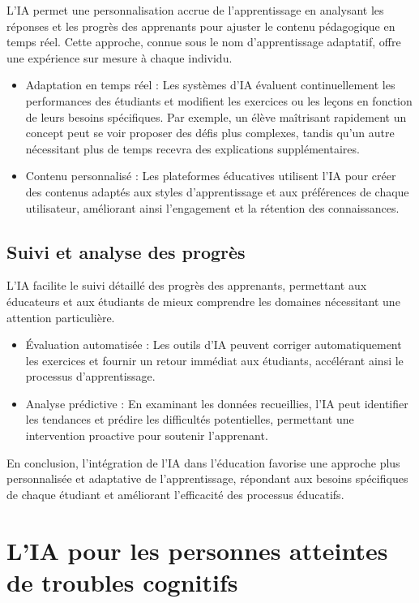 \documentclass[12pt,a4paper]{report}
\begin{document}
L'IA permet une personnalisation accrue de l'apprentissage en analysant les réponses et les progrès des apprenants pour ajuster le contenu pédagogique en temps réel. Cette approche, connue sous le nom d'apprentissage adaptatif, offre une expérience sur mesure à chaque individu.

\begin{itemize}
    \item Adaptation en temps réel : Les systèmes d'IA évaluent continuellement les performances des étudiants et modifient les exercices ou les leçons en fonction de leurs besoins spécifiques. Par exemple, un élève maîtrisant rapidement un concept peut se voir proposer des défis plus complexes, tandis qu'un autre nécessitant plus de temps recevra des explications supplémentaires. 
    \item Contenu personnalisé : Les plateformes éducatives utilisent l'IA pour créer des contenus adaptés aux styles d'apprentissage et aux préférences de chaque utilisateur, améliorant ainsi l'engagement et la rétention des connaissances.
\end{itemize}

\subsection{Suivi et analyse des progrès}

L'IA facilite le suivi détaillé des progrès des apprenants, permettant aux éducateurs et aux étudiants de mieux comprendre les domaines nécessitant une attention particulière.

\begin{itemize}
    \item Évaluation automatisée : Les outils d'IA peuvent corriger automatiquement les exercices et fournir un retour immédiat aux étudiants, accélérant ainsi le processus d'apprentissage. 
    \item Analyse prédictive : En examinant les données recueillies, l'IA peut identifier les tendances et prédire les difficultés potentielles, permettant une intervention proactive pour soutenir l'apprenant. 
\end{itemize}

En conclusion, l'intégration de l'IA dans l'éducation favorise une approche plus personnalisée et adaptative de l'apprentissage, répondant aux besoins spécifiques de chaque étudiant et améliorant l'efficacité des processus éducatifs.

\section{L'IA pour les personnes atteintes de troubles cognitifs}
\end{document}
